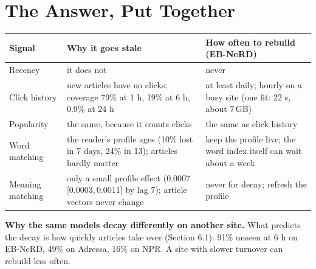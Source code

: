 \documentclass[11pt,a4paper]{article}
\newcommand{\ci}[2]{[#1,\,#2]}
\begin{document}
\section{The Answer, Put Together}
\begin{center}\small
\begin{tabularx}{\linewidth}{@{}lXX@{}}
\toprule
\textbf{Signal} & \textbf{Why it goes stale} & \textbf{How often to rebuild (EB-NeRD)}\\
\midrule
Recency & it does not & never\\
\rowcolor{green!12} Click history & new articles have no clicks: coverage 79\% at 1 h, 19\% at 6 h, 0.9\% at 24 h & at least daily; hourly on a busy site (one fit: 22 s, about 7\,GB)\\
Popularity & the same, because it counts clicks & the same as click history\\
Word matching & the reader's profile ages (10\% lost in 7 days, 24\% in 13); articles hardly matter & keep the profile live; the word index itself can wait about a week\\
Meaning matching & only a small profile effect (0.0007 \ci{0.0003}{0.0011} by lag 7); article vectors never change & never for decay; refresh the profile\\
\bottomrule
\end{tabularx}
\end{center}
\textbf{Why the same models decay differently on another site.} What predicts the decay is how quickly articles take over (Section 6.1): 91\% unseen at 6 h on EB-NeRD, 49\% on Adressa, 16\% on NPR. A site with slower turnover can rebuild less often.

\end{document}
